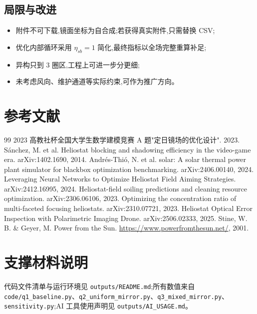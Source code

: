 \documentclass[UTF8,a4paper,12pt]{ctexart}
\begin{document}
\subsection{局限与改进}
\begin{itemize}[leftmargin=2em]
  \item 附件不可下载,镜面坐标为自合成;若获得真实附件,只需替换 CSV;
  \item 优化内部循环采用 $\eta_{sb}=1$ 简化,最终指标以全场完整重算补足;
  \item 异构只到 3 圈区,工程上可进一步分更细;
  \item 未考虑风向、维护通道等实际约束,可作为推广方向。
\end{itemize}

\section{参考文献}
\begin{thebibliography}{99}
 2023 高教社杯全国大学生数学建模竞赛 A 题"定日镜场的优化设计". 2023.
 Sánchez, M. et al. Heliostat blocking and shadowing efficiency in the video-game era. arXiv:1402.1690, 2014.
 Andrés-Thió, N. et al. solar: A solar thermal power plant simulator for blackbox optimization benchmarking. arXiv:2406.00140, 2024.
 Leveraging Neural Networks to Optimize Heliostat Field Aiming Strategies. arXiv:2412.16995, 2024.
 Heliostat-field soiling predictions and cleaning resource optimization. arXiv:2306.06106, 2023.
 Optimizing the concentration ratio of multi-faceted focusing heliostats. arXiv:2310.07721, 2023.
 Heliostat Optical Error Inspection with Polarimetric Imaging Drone. arXiv:2506.02333, 2025.
 Stine, W. B. \& Geyer, M. Power from the Sun. \url{https://www.powerfromthesun.net/}, 2001.
\end{thebibliography}

\appendix
\section{支撑材料说明}
代码文件清单与运行环境见 \texttt{outputs/README.md};所有数值来自 \texttt{code/q1\_baseline.py}、\texttt{q2\_uniform\_mirror.py}、\texttt{q3\_mixed\_mirror.py}、\texttt{sensitivity.py};AI 工具使用声明见 \texttt{outputs/AI\_USAGE.md}。
\end{document}
